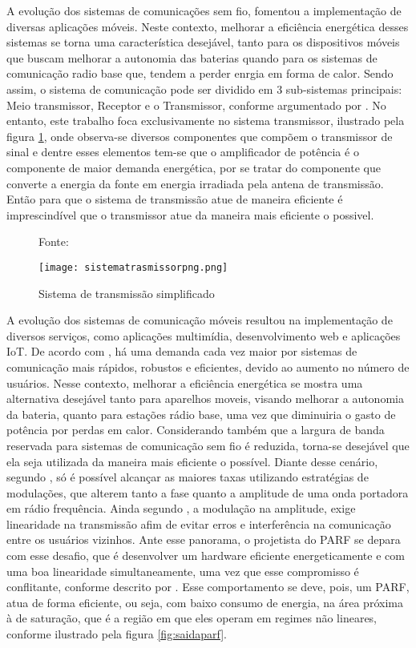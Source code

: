 A evolução dos sistemas de comunicações sem fio, fomentou a implementação de diversas aplicações móveis. Neste contexto, melhorar a eficiência energética desses sistemas se torna uma característica desejável, tanto para os dispositivos móveis que buscam melhorar a autonomia das baterias quando para os sistemas de comunicação radio base que, tendem a perder enrgia em forma de calor.  
Sendo assim, o sistema de comunicação pode ser dividido em 3 sub-sistemas principais: Meio transmissor, Receptor e o Transmissor, conforme argumentado por \cite{Schuartz2017}.
No entanto, este trabalho foca exclusivamente no sistema transmissor, ilustrado pela figura \ref{fig:sistemadetrasmissao}, onde observa-se diversos componentes que compõem o transmissor de sinal e dentre esses elementos tem-se que o amplificador de potência é o componente de maior demanda energética, por se tratar do componente que converte a energia da fonte em energia irradiada pela antena de transmissão. Então para que o sistema de transmissão atue de maneira eficiente é imprescindível que o transmissor atue da maneira mais eficiente o possivel.

\begin{figure}[ht!]
    \centering
    \captionsetup{justification=centering}
    \caption*{Fonte: \cite{Schuartz2017}}
    \texttt{[image: sistematrasmissorpng.png]}
    \caption{Sistema de transmissão simpliﬁcado}
    \label{fig:sistemadetrasmissao}
\end{figure}

A evolução dos sistemas de comunicação móveis resultou na implementação de diversos serviços, como aplicações multimídia, desenvolvimento web e aplicações IoT. De acordo com \cite{John2016}, há uma demanda cada vez maior por sistemas de comunicação mais rápidos, robustos e eficientes, devido ao aumento no número de usuários.  Nesse contexto, melhorar a eficiência energética se mostra uma alternativa desejável tanto para aparelhos moveis, visando melhorar a autonomia da bateria, quanto para estações rádio base, uma vez que diminuiria o gasto de potência por perdas em calor. Considerando também que a largura de banda reservada para sistemas de comunicação sem fio é reduzida, torna-se desejável que ela seja utilizada da maneira mais eficiente o possível. Diante desse cenário, segundo \cite{Kenington2000}, só é possível alcançar as maiores taxas utilizando estratégias de modulações, que alterem tanto a fase quanto a amplitude de uma onda portadora em rádio frequência. Ainda segundo \cite{Kenington2000}, a modulação na amplitude, exige linearidade na transmissão afim de evitar erros e interferência na comunicação entre os usuários vizinhos. Ante esse panorama, o projetista do PARF se depara com esse desafio, que é desenvolver um hardware eficiente energeticamente e com uma boa linearidade simultaneamente, uma vez que esse compromisso é conflitante, conforme descrito por \cite{Cripps2006}. Esse comportamento se deve, pois, um PARF, atua de forma eficiente, ou seja, com baixo consumo de energia, na área próxima à de saturação, que é a região em que eles operam em regimes não lineares, conforme ilustrado pela figura \ref{fig:saidaparf}.



